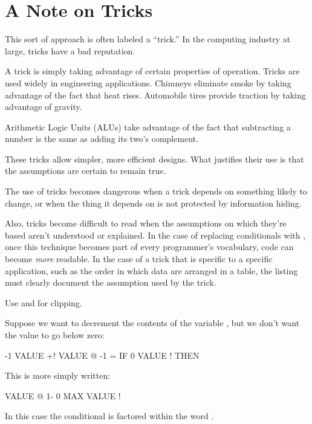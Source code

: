 \section{A Note on Tricks}%
%

This sort of approach is often labeled a ``trick.'' In the computing
industry at large, tricks have a bad reputation.

A trick is simply taking advantage of certain properties of operation.
Tricks are used widely in engineering applications. Chimneys
eliminate smoke by taking advantage of the fact that heat rises.
Automobile tires provide traction by taking advantage of gravity.

Arithmetic Logic Units (ALUs) take advantage of the fact that
subtracting a number is the same as adding its two's complement.

These tricks allow simpler, more efficient designs. What justifies
their use is that the assumptions are certain to remain true.

The use of tricks becomes dangerous when a trick depends on something
likely to change, or when the thing it depends on is not protected by
information hiding.

Also, tricks become difficult to read when the assumptions on which
they're based aren't understood or explained. In the case of replacing
conditionals with , once this technique becomes part of every
programmer's vocabulary, code can become \emph{more} readable. In the case
of a trick that is specific to a specific application, such as the order
in which data are arranged in a table, the listing must clearly document
the assumption used by the trick.%
%
%

\begin{tip}
Use  and  for clipping.
%
%
\end{tip}
Suppose we want to decrement the contents of the variable , but
we don't want the value to go below zero:

\begin{Code}
-1 VALUE +!  VALUE @  -1 = IF  0 VALUE !  THEN
\end{Code}
This is more simply written:

\begin{Code}
VALUE @  1-  0 MAX  VALUE !
\end{Code}
In this case the conditional is factored within the word .

